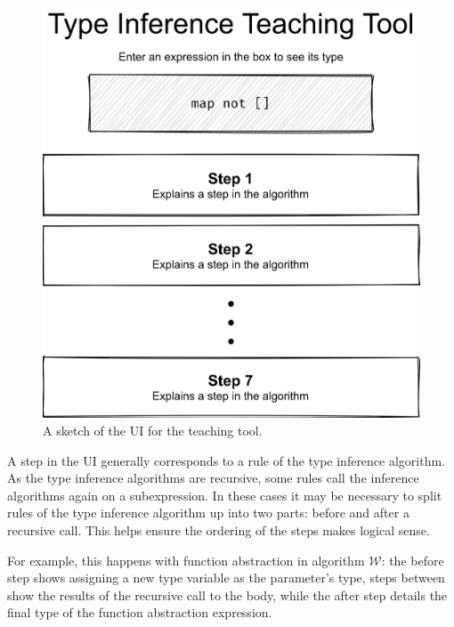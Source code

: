 \documentclass[a4paper,fleqn,oneside,12pt]{report}
\newcommand{\W}{$\mathcal{W}$}
\begin{document}
{\centering \begin{figure}[h!]
  \centering
  \includegraphics[width=0.9\linewidth]{images/image21.png}
  \caption{A sketch of the UI for the teaching tool.}
\end{figure} \par}

A step in the UI generally corresponds to a rule of the type inference algorithm. As the type inference algorithms are recursive, some rules call the inference algorithms again on a subexpression. In these cases it may be necessary to split rules of the type inference algorithm up into two parts: before and after a recursive call. This helps ensure the ordering of the steps makes logical sense.

For example, this happens with function abstraction in algorithm \W: the before step shows assigning a new type variable as the parameter’s type, steps between show the results of the recursive call to the body, while the after step details the final type of the function abstraction expression.
\end{document}
